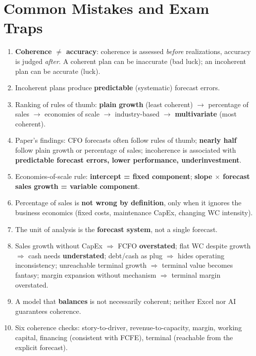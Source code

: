 \section{Common Mistakes and Exam Traps}

\begin{trapbox}
\begin{enumerate}[leftmargin=*]
  \item \textbf{Coherence $\neq$ accuracy}: coherence is assessed \emph{before} realizations, accuracy is judged \emph{after}. A coherent plan can be inaccurate (bad luck); an incoherent plan can be accurate (luck).
  \item Incoherent plans produce \textbf{predictable} (systematic) forecast errors.
  \item Ranking of rules of thumb: \textbf{plain growth} (least coherent) $\to$ percentage of sales $\to$ economies of scale $\to$ industry-based $\to$ \textbf{multivariate} (most coherent).
  \item Paper's findings: CFO forecasts often follow rules of thumb; \textbf{nearly half} follow plain growth or percentage of sales; incoherence is associated with \textbf{predictable forecast errors, lower performance, underinvestment}.
  \item Economies-of-scale rule: \textbf{intercept = fixed component}; \textbf{slope $\times$ forecast sales growth = variable component}.
  \item Percentage of sales is \textbf{not wrong by definition}, only when it ignores the business economics (fixed costs, maintenance CapEx, changing WC intensity).
  \item The unit of analysis is the \textbf{forecast system}, not a single forecast.
  \item Sales growth without CapEx $\Rightarrow$ FCFO \textbf{overstated}; flat WC despite growth $\Rightarrow$ cash needs \textbf{understated}; debt/cash as plug $\Rightarrow$ hides operating inconsistency; unreachable terminal growth $\Rightarrow$ terminal value becomes fantasy; margin expansion without mechanism $\Rightarrow$ terminal margin overstated.
  \item A model that \textbf{balances} is not necessarily coherent; neither Excel nor AI guarantees coherence.
  \item Six coherence checks: story-to-driver, revenue-to-capacity, margin, working capital, financing (consistent with FCFE), terminal (reachable from the explicit forecast).
\end{enumerate}
\end{trapbox}
